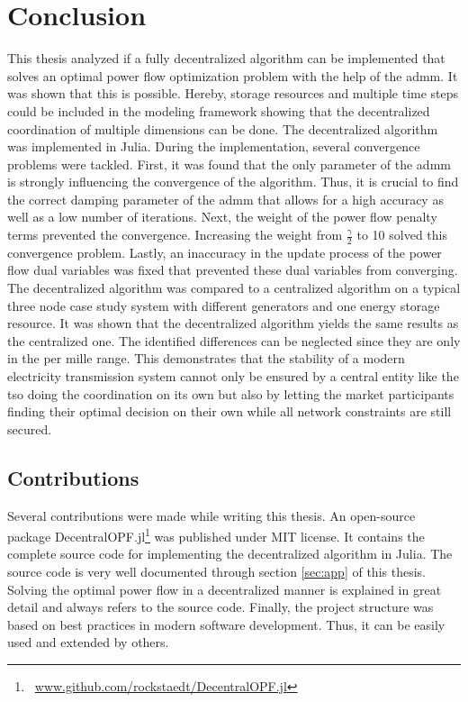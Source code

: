 \section{Conclusion}

This thesis analyzed if a fully decentralized algorithm can be implemented that solves an optimal power flow optimization problem with the help of the \gls{admm}. It was shown that this is possible. Hereby, storage resources and multiple time steps could be included in the modeling framework showing that the decentralized coordination of multiple dimensions can be done. The decentralized algorithm was implemented in Julia. During the implementation, several convergence problems were tackled. First, it was found that the only parameter of the \gls{admm} is strongly influencing the convergence of the algorithm. Thus, it is crucial to find the correct damping parameter of the \gls{admm} that allows for a high accuracy as well as a low number of iterations. Next, the weight of the power flow penalty terms prevented the convergence. Increasing the weight from $\frac{\gamma}{2}$ to 10 solved this convergence problem. Lastly, an inaccuracy in the update process of the power flow dual variables was fixed that prevented these dual variables from converging. The decentralized algorithm was compared to a centralized algorithm on a typical three node case study system with different generators and one energy storage resource. It was shown that the decentralized algorithm yields the same results as the centralized one. The identified differences can be neglected since they are only in the per mille range. This demonstrates that the stability of a modern electricity transmission system cannot only be ensured by a central entity like the \gls{tso} doing the coordination on its own but also by letting the market participants finding their optimal decision on their own while all network constraints are still secured.

\subsection{Contributions}

Several contributions were made while writing this thesis. An open-source package DecentralOPF.jl\footnote{~\url{www.github.com/rockstaedt/DecentralOPF.jl}} was published under MIT license. It contains the complete source code for implementing the decentralized algorithm in Julia. The source code is very well documented through section \ref{sec:app} of this thesis. Solving the optimal power flow in a decentralized manner is explained in great detail and always refers to the source code. Finally, the project structure was based on best practices in modern software development. Thus, it can be easily used and extended by others.

